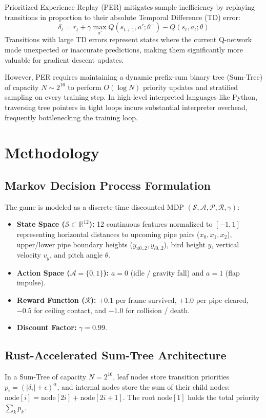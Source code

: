 \documentclass[12pt,a4paper]{article}
\begin{document}
Prioritized Experience Replay (PER) mitigates sample inefficiency by replaying transitions in proportion to their absolute Temporal Difference (TD) error:
\begin{equation}
\delta_t = r_t + \gamma \max_{a'} Q(s_{t+1}, a'; \theta^-) - Q(s_t, a_t; \theta)
\end{equation}
Transitions with large TD errors represent states where the current Q-network made unexpected or inaccurate predictions, making them significantly more valuable for gradient descent updates.

However, PER requires maintaining a dynamic prefix-sum binary tree (Sum-Tree) of capacity $N \sim 2^{16}$ to perform $O(\log N)$ priority updates and stratified sampling on every training step. In high-level interpreted languages like Python, traversing tree pointers in tight loops incurs substantial interpreter overhead, frequently bottlenecking the training loop.

\section{Methodology}
\subsection{Markov Decision Process Formulation}
The game is modeled as a discrete-time discounted MDP $(\mathcal{S}, \mathcal{A}, \mathcal{P}, \mathcal{R}, \gamma)$:
\begin{itemize}
    \item \textbf{State Space ($\mathcal{S} \subset \mathbb{R}^{12}$):} 12 continuous features normalized to $[-1, 1]$ representing horizontal distances to upcoming pipe pairs ($x_0, x_1, x_2$), upper/lower pipe boundary heights ($y_{u0..2}, y_{l0..2}$), bird height $y$, vertical velocity $v_y$, and pitch angle $\theta$.
    \item \textbf{Action Space ($\mathcal{A} = \{0, 1\}$):} $a=0$ (idle / gravity fall) and $a=1$ (flap impulse).
    \item \textbf{Reward Function ($\mathcal{R}$):} $+0.1$ per frame survived, $+1.0$ per pipe cleared, $-0.5$ for ceiling contact, and $-1.0$ for collision / death.
    \item \textbf{Discount Factor:} $\gamma = 0.99$.
\end{itemize}

\subsection{Rust-Accelerated Sum-Tree Architecture}
In a Sum-Tree of capacity $N = 2^{16}$, leaf nodes store transition priorities $p_i = (|\delta_i| + \epsilon)^\alpha$, and internal nodes store the sum of their child nodes: $\text{node}[i] = \text{node}[2i] + \text{node}[2i+1]$. The root $\text{node}[1]$ holds the total priority $\sum_k p_k$.
\end{document}
